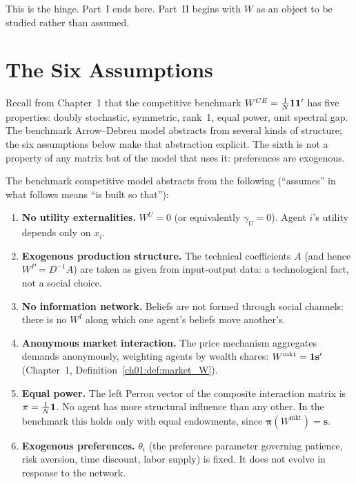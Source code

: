 \documentclass[../structural_economics_book.tex]{subfiles}
\begin{document}
This is the hinge. Part~I ends here. Part~II begins with $W$ as an object to be studied rather than assumed.


\section{The Six Assumptions}
\label{ch04:sec:six}

Recall from Chapter~1 that the competitive benchmark $W^{CE} = \frac{1}{N}\mathbf{1}\mathbf{1}'$ has five properties: doubly stochastic, symmetric, rank~1, equal power, unit spectral gap. The benchmark Arrow--Debreu model abstracts from several kinds of structure; the six assumptions below make that abstraction explicit. The sixth is not a property of any matrix but of the model that uses it: preferences are exogenous.

\begin{definition}\label{ch04:def:six}
The benchmark competitive model abstracts from the following (``assumes'' in what follows means ``is built so that''):
\begin{enumerate}
\item[\textbf{A1.}] \textbf{No utility externalities.} $W^U = 0$ (or equivalently $\gamma_U = 0$). Agent $i$'s utility depends only on $x_i$.
\item[\textbf{A2.}] \textbf{Exogenous production structure.} The technical coefficients $A$ (and hence $W^P = D^{-1}A$) are taken as given from input-output data: a technological fact, not a social choice.
\item[\textbf{A3.}] \textbf{No information network.} Beliefs are not formed through social channels: there is no $W^I$ along which one agent's beliefs move another's.
\item[\textbf{A4.}] \textbf{Anonymous market interaction.} The price mechanism aggregates demands anonymously, weighting agents by wealth shares: $W^{\text{mkt}} = \mathbf{1}\mathbf{s}'$ (Chapter~1, Definition~\ref{ch01:def:market_W}).
\item[\textbf{A5.}] \textbf{Equal power.} The left Perron vector of the composite interaction matrix is $\pi = \frac{1}{N}\mathbf{1}$. No agent has more structural influence than any other. In the benchmark this holds only with equal endowments, since $\boldsymbol{\pi}(W^{\text{mkt}}) = \mathbf{s}$.
\item[\textbf{A6.}] \textbf{Exogenous preferences.} $\theta_i$ (the preference parameter governing patience, risk aversion, time discount, labor supply) is fixed. It does not evolve in response to the network.
\end{enumerate}
\end{definition}
\end{document}
